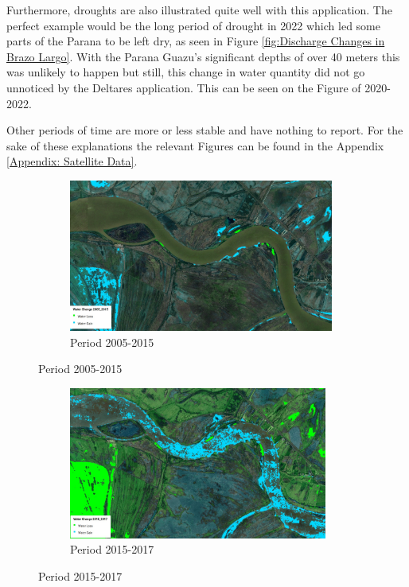 Furthermore, droughts are also illustrated quite well with this application. The perfect example would be the long period of drought in 2022 which led some parts of the Parana to be left dry, as seen in Figure \ref{fig:Discharge Changes in Brazo Largo}. With the Parana Guazu's significant depths of over 40 meters this was unlikely to happen but still, this change in water quantity did not go unnoticed by the Deltares application. This can be seen on the Figure of 2020-2022.

Other periods of time are more or less stable and have nothing to report. For the sake of these explanations the relevant Figures can be found in the Appendix \ref{Appendix: Satellite Data}.

\begin{figure}[H]
    \centering
    \begin{subfigure}[a]{0.6\textwidth}
        \includegraphics[width=\linewidth, height=5cm]{figures/ch5/2005-2015.jpg}
        \caption{Period 2005-2015}
        \label{fig:Period 2005-2015}
    \end{subfigure}
\end{figure}

\begin{figure}[H]
    \centering
    \begin{subfigure}[b]{0.6\textwidth}
        \includegraphics[width=\linewidth, height=5cm]{figures/ch5/2015-2017.jpg}
        \caption{Period 2015-2017}
        \label{fig:Period 2015-2017}
    \end{subfigure}
\end{figure}

